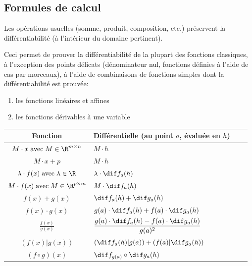 \subsection{Formules de calcul}

\begin{myprop}
	Les opérations usuelles (somme, produit, composition, etc.) préservent la différentiabilité
	(à l'intérieur du domaine pertinent).

	Ceci permet de prouver la différentiabilité de la plupart des fonctions classiques,
	à l'exception des points délicats
	(dénominateur nul, fonctions définies à l'aide de cas par morceaux),
	à l'aide de combinaisons de fonctions simples dont la différentiabilité est prouvée:
	\begin{enumerate}
		\item les fonctions linéaires et affines
		\item les fonctions dérivables à une variable
	\end{enumerate}
\end{myprop}

\noindent
\begin{tabularx}{1.0\textwidth}{|S X|S X|}
	\hline
	Fonction & Différentielle (au point $a$, évaluée en $h$)\\
	\hline
	$ \displaystyle M \cdot x \;\text{avec}\; M \in \R^{m \times n} $ & $\displaystyle M \cdot h $\\
	\hline
	$ \displaystyle M \cdot x + p $ & $\displaystyle  M \cdot h $ \\
	\hline
	$ \lambda \cdot f(x) \;\text{avec}\; \lambda \in \R $ & $\displaystyle \lambda \cdot \dif f_a (h) $ \\
	\hline
	$ \displaystyle M \cdot f(x) \;\text{avec}\; M \in \R^{p \times m}$ & $\displaystyle M \cdot \dif f_a (h)$ \\
	\hline
	$ \displaystyle f(x) + g(x) $ & $ \displaystyle \dif f_a (h) + \dif g_a (h) $ \\
	\hline
	$ \displaystyle f(x)\cdot g(x) $ & $\displaystyle  g(a) \cdot \dif f_a(h) + f(a) \cdot \dif g_a(h) $ \\
	\hline
	$ \displaystyle \frac{f(x)}{g(x)} $ & $\displaystyle  \frac{g(a) \cdot \dif f_a(h) - f(a) \cdot \dif g_a(h) }{g(a)^2} $ \\
	\hline
	$ \displaystyle (f(x)|g(x)) $ & $\displaystyle  (\dif f_a(h) | g(a) ) + (f(a)|\dif g_a(h)) $ \\
	\hline
	$ \displaystyle (f \circ g)(x) $ & $\displaystyle  \dif f_{g(a)} \circ \dif g_a(h) $ \\
	\hline
\end{tabularx}

